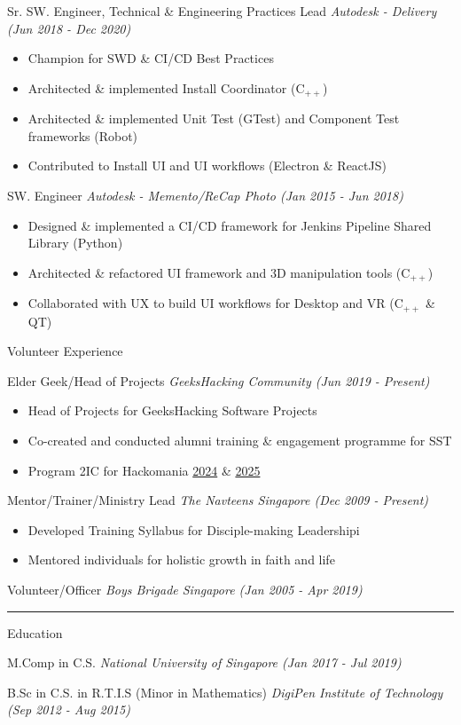 \documentclass[letterpaper,11pt]{article}
\newcommand{\cvtitle}[1]{\Large\raggedright \textcolor{section_color}{#1}\\}
\newcommand{\cvhead}[1]{\large\raggedright \textcolor{subsection_color}{#1}\\}
\newcommand{\cvlist}[1]{\vspace{-12pt}\small \textcolor{item_color}{\begin{itemize}#1\end{itemize}}}
\newcommand{\cvli}[1]{\vspace{-4pt} \item{#1}}
\newcommand{\cvline}[0]{\noindent\rule{19cm}{0.4pt}}
\newcommand{\link}[2]{\textcolor{link_color}{\href{#1}{#2}}}
\newcommand{\qualifier}[1]{\hfill \textsl{\footnotesize #1}}
\begin{document}
\cvhead{Sr. SW. Engineer, Technical \& Engineering Practices Lead \qualifier{Autodesk - Delivery (Jun 2018 - Dec 2020)}}
\cvlist{
    \cvli{Champion for SWD \& CI/CD Best Practices}
    \cvli{Architected \& implemented Install Coordinator (C$_{++}$)}
    \cvli{Architected \& implemented Unit Test (GTest) and Component Test frameworks (Robot)}
    \cvli{Contributed to Install UI and UI workflows (Electron \& ReactJS)}
}

\cvhead{SW. Engineer \qualifier{Autodesk - Memento/ReCap Photo (Jan 2015 - Jun 2018)}}
\cvlist{
    \cvli{Designed \& implemented a CI/CD framework for Jenkins Pipeline Shared Library (Python)}
    \cvli{Architected \& refactored UI framework and 3D manipulation tools (C$_{++}$)}
    \cvli{Collaborated with UX to build UI workflows for Desktop and VR (C$_{++}$ \& QT)}
}

\cvtitle{Volunteer Experience}

\cvhead{Elder Geek/Head of Projects \qualifier{GeeksHacking Community (Jun 2019 - Present)}}
\cvlist{
    \cvli{Head of Projects for GeeksHacking Software Projects}
    \cvli{Co-created and conducted alumni training \& engagement programme for SST}
    \cvli{Program 2IC for Hackomania \link{https://hackomania2024.geekshacking.com/}{2024} \& \link{https://hackomania2025.geekshacking.com/}{2025}}
}

\cvhead{Mentor/Trainer/Ministry Lead \qualifier{The Navteens Singapore (Dec 2009 - Present)}}
\cvlist{
    \cvli{Developed Training Syllabus for Disciple-making Leadershipi}
    \cvli{Mentored individuals for holistic growth in faith and life}
}

\cvhead{Volunteer/Officer \qualifier{Boys Brigade Singapore (Jan 2005 - Apr 2019)}}

\cvline

\cvtitle{Education}

\cvhead{M.Comp in C.S. \qualifier{National University of Singapore (Jan 2017 - Jul 2019)}}

\cvhead{B.Sc in C.S. in R.T.I.S (Minor in Mathematics) \qualifier{DigiPen Institute of Technology (Sep 2012 - Aug 2015)}}
\end{document}

